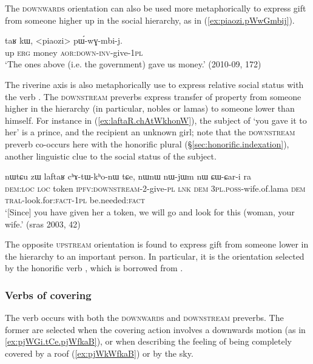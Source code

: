 The \textsc{downwards} orientation can also be used more metaphorically to express gift from someone higher up in the social hierarchy, as in (\ref{ex:piaozi.pWwGmbij}).

\begin{exe}
\ex \label{ex:piaozi.pWwGmbij}
\gll  taʁ kɯ, <piaozi> pɯ́-wɣ-mbi-j. \\
up \textsc{erg} money \textsc{aor}:\textsc{down}-\textsc{inv}-give-\textsc{1pl}  \\
\glt  `The ones above (i.e. the government) gave us money.' (2010-09, 172)
\end{exe}

The riverine axis is also metaphorically use to express relative social status with the verb . The \textsc{downstream} preverbs express transfer of property from someone higher in the hierarchy (in particular, nobles or lamas) to someone lower than himself. For instance in (\ref{ex:laftaR.chAtWkhonW}), the subject of  `you gave it to her' is a prince, and the recipient an unknown girl; note that the \textsc{downstream} preverb co-occurs here with the honorific plural (§\ref{sec:honorific.indexation}), another linguistic clue to the social status of the subject.

\begin{exe}
\ex \label{ex:laftaR.chAtWkhonW}
\gll nɯtɕu zɯ laftaʁ cʰɤ-tɯ-kʰo-nɯ tɕe, nɯnɯ nɯ-jɯm nɯ ɕɯ-ɕar-i ra \\
\textsc{dem}:\textsc{loc} \textsc{loc} token \textsc{ipfv}:\textsc{downstream}-2-give-\textsc{pl} \textsc{lnk} \textsc{dem} \textsc{3pl}.\textsc{poss}-wife.of.lama \textsc{dem} \textsc{tral}-look.for:\textsc{fact}-\textsc{1pl} be.needed:\textsc{fact} \\
\glt `[Since] you have given her a token, we will go and look for this (woman, your wife.' (sras 2003, 42)
\end{exe}

The opposite \textsc{upstream} orientation is found to express gift from someone lower in the hierarchy to an important person. In particular, it is the orientation selected by the honorific verb , which is borrowed from .
 
\subsubsection{Verbs of covering} \label{sec:preverb.cover}
The verb  occurs with both the \textsc{downwards} and \textsc{downstream} preverbs. The former are selected when the covering action involves a downwards motion (as in \ref{ex:pjWGi.tCe.pjWfkaB}), or when describing the feeling of being completely covered by a roof (\ref{ex:pjWkWfkaB}) or by the sky.

